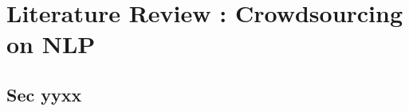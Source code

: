 \chapter{Literature Review : Crowdsourcing on NLP }
\label{cha:relatedwork}
\section{Sec yyxx}






 


